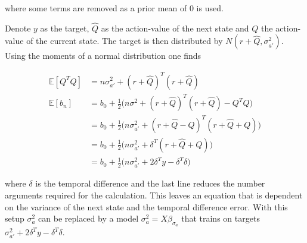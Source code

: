 where some terms are removed as a prior mean of 0 is used.

Denote $y$ as the target, $\hat{Q}$ as the action-value of the next state and $Q$ the action-value of the current state. The target is then distributed by $N(r + \hat{Q}, \sigma^2_{a'})$. Using the moments of a normal distribution one finds

\begin{equation}
    \begin{split}
        \mathbb{E}[Q^TQ] &= n\sigma^2_{a'} + (r + \hat{Q})^T(r + \hat{Q})\\
        \mathbb{E}[b_n] &= b_0 + \frac{1}{2}\bigg(n\sigma^2 + (r + \hat{Q})^T(r + \hat{Q}) - Q^TQ\bigg)\\
        &= b_0 + \frac{1}{2}\bigg(n\sigma^2_{a'} + (r + \hat{Q} - Q)^T(r + \hat{Q} + Q)\bigg)\\
        &= b_0 + \frac{1}{2}\bigg(n\sigma^2_{a'} + \delta^T(r + \hat{Q} + Q)\bigg)\\
        &= b_0 + \frac{1}{2}\bigg(n\sigma^2_{a'} + 2\delta^Ty-\delta^T\delta\bigg)
    \end{split}
\end{equation}

where $\delta$ is the temporal difference and the last line reduces the number arguments required for the calculation. This leaves an equation that is dependent on the variance of the next state and the temporal difference error. With this setup $\sigma^2_a$ can be replaced by a model $\sigma^2_{a} = X\beta_{\sigma_{a}}$ that trains on targets $\sigma^2_{a'} + 2\delta^Ty-\delta^T\delta$.

\cleardoublepage